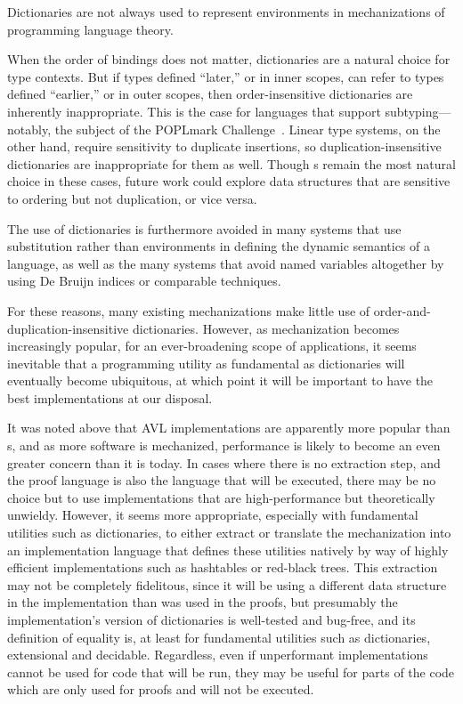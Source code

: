 
Dictionaries are not always used to represent environments in mechanizations of programming language theory.

When the order of bindings does not matter, dictionaries are a natural choice for type contexts.
%
But if types defined ``later,'' or in inner scopes, can refer to types defined ``earlier,'' or in outer scopes, then order-insensitive dictionaries are inherently inappropriate.
%
This is the case for languages that support subtyping---notably, the subject of the POPLmark Challenge~\citep{POPLmark}.
%
Linear type systems, on the other hand, require sensitivity to duplicate insertions, so duplication-insensitive dictionaries are inappropriate for them as well.
%
Though {\sal}s remain the most natural choice in these cases, future work could explore data structures that are sensitive to ordering but not duplication, or vice versa.

The use of dictionaries is furthermore avoided in many systems that use substitution rather than environments
%
in defining the dynamic semantics of a language, as well as the many systems that avoid named variables altogether by using De Bruijn indices \cite{XXX,XXX,XXX} or comparable techniques.

For these reasons, many existing mechanizations make little use of order-and-duplication-insensitive dictionaries. 
%
However, as mechanization becomes increasingly popular, for an ever-broadening scope of applications,
%
it seems inevitable that a programming utility as fundamental as dictionaries will eventually become ubiquitous, at which point it will be important to have the
%
best implementations at our disposal.

%
It was noted above that AVL implementations are apparently more popular than {\cal}s, and as more software is mechanized, performance is likely to become an
%
even greater concern than it is today. In cases where there is no extraction step, and the proof language is also the language that will be executed,
%
there may be no choice but to use implementations that are high-performance but theoretically unwieldy. However, it seems more appropriate, especially with
%
fundamental utilities such as dictionaries, to either extract or translate the mechanization into an implementation language that defines these utilities natively
%
by way of highly efficient implementations such as hashtables or red-black trees. This extraction may not be completely fidelitous, since it will be using a
%
different data structure in the implementation than was used in the proofs, but presumably the implementation's version of dictionaries is well-tested and bug-free,
%
and its definition of equality is, at least for fundamental utilities such as dictionaries, extensional and decidable. Regardless, even if unperformant implementations
%
cannot be used for code that will be run, they may be useful for parts of the code which are only used for proofs and will not be executed.

